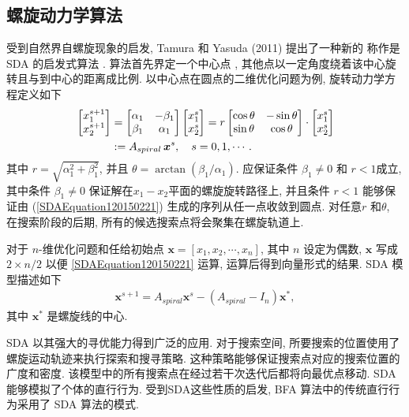 \subsection{螺旋动力学算法}
受到自然界自螺旋现象的启发, Tamura 和 Yasuda (2011) 提出了一种新的 称作是 SDA 的启发式算法 .
算法首先界定一个中心点 , 其他点以一定角度绕着该中心旋转且与到中心的距离成比例. 以中心点在圆点的二维优化问题为例, 旋转动力学方程定义如下
\begin{align}\label{SDAEquation120150221}
  \begin{bmatrix}
    x_1^{s+1}\\
    x_2^{s+1}
  \end{bmatrix}
  &  =
    \begin{bmatrix}
    \alpha_1&  -\beta_1\\
    \beta_1& \alpha_1
  \end{bmatrix}
    \begin{bmatrix}
        x_1^{s}\\
        x_2^{s}
  \end{bmatrix}\notag
  = r\begin{bmatrix}
    \cos\theta &  -\sin\theta\\
    \sin\theta&  \cos\theta
  \end{bmatrix}\cdot
    \begin{bmatrix}
        x_1^{s}\\
        x_2^{s}
  \end{bmatrix}\\
  &:=A_{spiral}\,\bm x^s,\quad s=0,1,\cdots.
\end{align}
其中 $r=\sqrt{\alpha_1^2+\beta_1^2}$, 并且 $\theta=\arctan(\beta_1/\alpha_1)$.
应保证条件 $\beta_1\neq 0$ 和 $r < 1$成立, 其中条件 $\beta_1\neq 0$ 保证解在$x_1 - x_2$平面的螺旋旋转路径上, 并且条件 $r < 1$ 能够保证由 (\ref{SDAEquation120150221}) 生成的序列从任一点收敛到圆点.
对任意$r$ 和$\theta$, 在搜索阶段的后期, 所有的候选搜索点将会聚集在螺旋轨道上.

对于 $n$-维优化问题和任给初始点 $\bm x=[x_1 ,x_2,\cdots, x_n]$, 其中 $n$ 设定为偶数, $\bm x$ 写成 $ 2\times n/2$ 以便 \eqref{SDAEquation120150221} 运算, 运算后得到向量形式的结果. SDA 模型描述如下
\begin{align}
    \bm x^{s+1}=A_{spiral}\bm x^s-(A_{spiral}-I_n)\bm x^*,
\end{align}
其中 $\bm x^{*}$ 是螺旋线的中心.

SDA 以其强大的寻优能力得到广泛的应用. 对于搜索空间, 所要搜索的位置使用了螺旋运动轨迹来执行探索和搜寻策略.
这种策略能够保证搜索点对应的搜索位置的广度和密度. 该模型中的所有搜索点在经过若干次迭代后都将向最优点移动.
SDA能够模拟了个体的直行行为. 受到SDA这些性质的启发, BFA 算法中的传统直行行为采用了 SDA 算法的模式.
